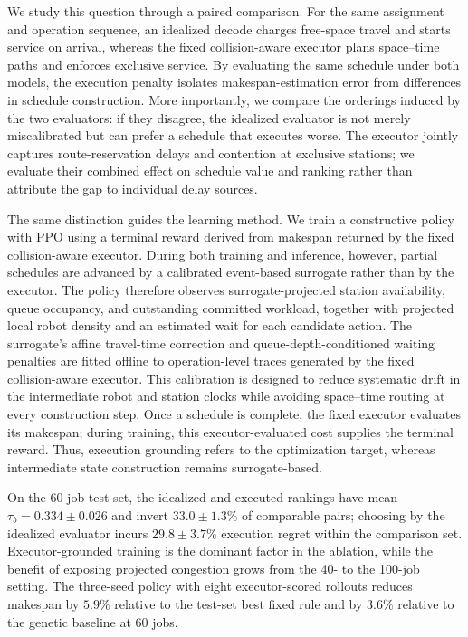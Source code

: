 We study this question through a paired comparison. For the same assignment
and operation sequence, an idealized decode charges free-space travel and
starts service on arrival, whereas the fixed collision-aware executor plans
space--time paths and enforces exclusive service. By evaluating the same
schedule under both models, the execution penalty isolates
makespan-estimation error from differences in schedule construction. More
importantly, we compare the orderings induced by the two evaluators: if they
disagree, the idealized evaluator is not merely miscalibrated but can prefer a
schedule that executes worse. The executor jointly captures route-reservation
delays and contention at exclusive stations; we evaluate their combined effect
on schedule value and ranking rather than attribute the gap to individual
delay sources.

The same distinction guides the learning method. We train a constructive
policy with PPO using a terminal reward derived from makespan returned by the
fixed collision-aware executor. During both training and inference, however,
partial schedules are advanced by a calibrated event-based surrogate rather
than by the executor. The policy therefore observes surrogate-projected station
availability, queue occupancy, and outstanding committed workload, together
with projected local robot density and an estimated wait for each candidate
action. The surrogate's affine travel-time correction and
queue-depth-conditioned waiting penalties are fitted offline to
operation-level traces generated by the fixed collision-aware executor. This
calibration is designed to reduce systematic drift in the intermediate robot
and station clocks while avoiding space--time routing at every construction
step. Once a schedule is complete, the fixed executor evaluates its makespan;
during training, this executor-evaluated cost supplies the terminal reward.
Thus, execution grounding refers to the optimization target, whereas
intermediate state construction remains surrogate-based.

On the 60-job test set, the idealized and executed rankings have mean
$\tau_b=0.334\pm0.026$ and invert $33.0\pm1.3\%$ of comparable pairs; choosing
by the idealized evaluator incurs $29.8\pm3.7\%$ execution regret within the
comparison set. Executor-grounded training is the dominant factor in the
ablation, while the benefit of exposing projected congestion grows from the
40- to the 100-job setting. The three-seed policy with eight executor-scored
rollouts reduces makespan by $5.9\%$ relative to the test-set best fixed rule
and by $3.6\%$ relative to the genetic baseline at 60 jobs.

